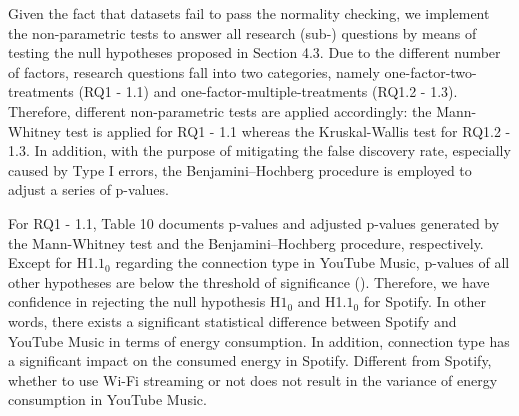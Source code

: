 Given the fact that datasets fail to pass the normality checking, we implement the non-parametric tests to answer all research (sub-) questions by means of testing the null hypotheses proposed in Section 4.3. Due to the different number of factors, research questions fall into two categories, namely one-factor-two-treatments (RQ1 - 1.1) and one-factor-multiple-treatments (RQ1.2 - 1.3). Therefore, different non-parametric tests are applied accordingly: the Mann-Whitney test is applied for RQ1 - 1.1 whereas the Kruskal-Wallis test for RQ1.2 - 1.3. In addition, with the purpose of mitigating the false discovery rate, especially caused by Type I errors, the Benjamini–Hochberg procedure is employed to adjust a series of p-values.  

For RQ1 - 1.1, Table 10 documents p-values and adjusted p-values generated by the Mann-Whitney test and the Benjamini–Hochberg procedure, respectively. Except for H1.$1_0$ regarding the connection type in YouTube Music, p-values of all other hypotheses are below the threshold of significance (). Therefore, we have confidence in rejecting the null hypothesis H$1_0$ and H1.$1_0$ for Spotify. In other words, there exists a significant statistical difference between Spotify and YouTube Music in terms of energy consumption. In addition, connection type has a significant impact on the consumed energy in Spotify. Different from Spotify, whether to use Wi-Fi streaming or not does not result in the variance of energy consumption in YouTube Music.


